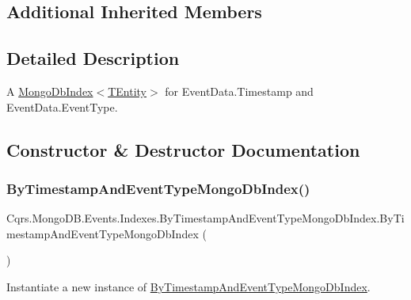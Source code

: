 \subsection*{Additional Inherited Members}


\subsection{Detailed Description}
A \hyperlink{classCqrs_1_1MongoDB_1_1DataStores_1_1Indexes_1_1MongoDbIndex_a61f4b17dd968f92e81562c70ae062a89_a61f4b17dd968f92e81562c70ae062a89}{Mongo\+Db\+Index$<$\+T\+Entity$>$} for Event\+Data.\+Timestamp and Event\+Data.\+Event\+Type. 



\subsection{Constructor \& Destructor Documentation}
\mbox{\label{classCqrs_1_1MongoDB_1_1Events_1_1Indexes_1_1ByTimestampAndEventTypeMongoDbIndex_ac31e888bf88b4cabc9f7be0dd1fc3ffc_ac31e888bf88b4cabc9f7be0dd1fc3ffc}} 
\subsubsection{\texorpdfstring{By\+Timestamp\+And\+Event\+Type\+Mongo\+Db\+Index()}{ByTimestampAndEventTypeMongoDbIndex()}}
{\footnotesize\ttfamily Cqrs.\+Mongo\+D\+B.\+Events.\+Indexes.\+By\+Timestamp\+And\+Event\+Type\+Mongo\+Db\+Index.\+By\+Timestamp\+And\+Event\+Type\+Mongo\+Db\+Index (\begin{DoxyParamCaption}{ }\end{DoxyParamCaption})}



Instantiate a new instance of \hyperlink{classCqrs_1_1MongoDB_1_1Events_1_1Indexes_1_1ByTimestampAndEventTypeMongoDbIndex}{By\+Timestamp\+And\+Event\+Type\+Mongo\+Db\+Index}. 

